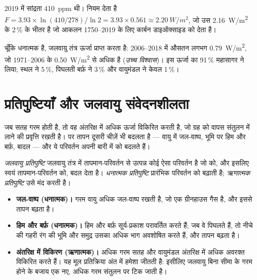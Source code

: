 \begin{example}[आकलन के सापेक्ष नियम की जाँच]\label{ex:g12:climate-change:check}
2019 में सांद्रता \qty{410}{ppm} थी। नियम देता है
$F = 3.93 \times \ln(410/278)/\ln 2 = 3.93 \times 0.561 \approx
\qty{2.20}{W/m^2}$, जो उस \qty{2.16}{W/m^2} के 2\,\% के भीतर है जो
आकलन 1750--2019 के लिए कार्बन डाइऑक्साइड को देता है।
\end{example}

\begin{proposition}[अतिरिक्त ऊर्जा कहाँ जाती है]\label{prop:g12:climate-change:heating}
चूँकि  धनात्मक है, जलवायु तंत्र ऊर्जा प्राप्त करता है: 2006--2018 में
औसतन लगभग \qty{0.79}{W/m^2}, जो 1971--2006 के \qty{0.50}{W/m^2} से
अधिक है (\emph{उच्च विश्वास})। इस ऊर्जा का 91\,\% महासागर ने लिया;
स्थल ने 5\,\%, पिघलती बर्फ़ ने 3\,\% और वायुमंडल ने केवल 1\,\%।
\end{proposition}

\section{प्रतिपुष्टियाँ और जलवायु संवेदनशीलता}

जब सतह गरम होती है, तो वह अंतरिक्ष में अधिक ऊर्जा विकिरित करती है, जो ग्रह को
वापस संतुलन में लाने की प्रवृत्ति रखती है। पर तापन दूसरी चीज़ें भी
बदलता है --- वायु में जल-वाष्प, भूमि पर हिम और बर्फ़,
बादल --- और ये परिवर्तन अपनी बारी में  को बदलते हैं।

\begin{definition}[जलवायु प्रतिपुष्टि]\label{def:g12:climate-change:feedback}
\emph{जलवायु प्रतिपुष्टि} जलवायु तंत्र में तापमान-परिवर्तन
से उत्पन्न कोई ऐसा परिवर्तन है जो  को, और इसलिए स्वयं
तापमान-परिवर्तन को, बदल देता है। \emph{धनात्मक प्रतिपुष्टि} प्रारंभिक
परिवर्तन को बढ़ाती है; \emph{ऋणात्मक प्रतिपुष्टि} उसे मंद करती है।
\end{definition}

\begin{example}[तीन प्रतिपुष्टियाँ]\label{ex:g12:climate-change:three}
\begin{itemize}
  \item \textbf{जल-वाष्प (धनात्मक)।} गरम वायु अधिक जल-वाष्प
        रखती है, जो एक ग्रीनहाउस गैस है, और इससे तापन बढ़ता है।
  \item \textbf{हिम और बर्फ़ (धनात्मक)।} हिम और बर्फ़ सूर्य-प्रकाश परावर्तित करते हैं;
        जब वे पिघलते हैं, तो नीचे की गहरी रंग की भूमि और समुद्र उसका अधिक भाग अवशोषित करते हैं,
        और तापन बढ़ता है।
  \item \textbf{अंतरिक्ष में विकिरण (ऋणात्मक)।} अधिक गरम सतह और
        वायुमंडल अंतरिक्ष में अधिक अवरक्त विकिरित करते हैं। यह मूल प्रतिक्रिया
        अंत में हमेशा जीतती है: इसीलिए जलवायु बिना सीमा के गरम होने के बजाय
        एक नए, अधिक गरम संतुलन पर टिक जाती है।
\end{itemize}
\end{example}

